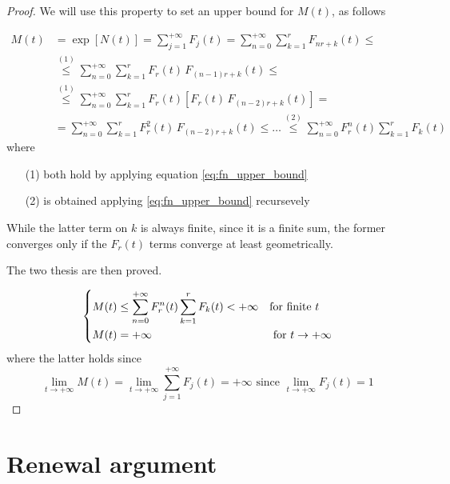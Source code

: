 \begin{proof}
	We will use this property to set an upper bound for $M(t)$, as follows

	\begin{equation} \label{eq:mt_convergence}
		\begin{split}
			M(t) &= \exp[N(t)] = \sum\limits_{j=1}^{+\infty} F_j(t) = \sum\limits_{n=0}^{+\infty} \sum\limits_{k=1}^{r} F_{n r + k}(t) \le \\
			& \stackrel{(1)}{\le} \sum\limits_{n=0}^{+\infty} \sum\limits_{k=1}^{r} F_r(t) \, F_{(n-1) r + k}(t) \le \\
			& \stackrel{(1)}{\le} \sum\limits_{n=0}^{+\infty} \sum\limits_{k=1}^{r} F_r(t) \left[ F_r(t) \, F_{(n-2) r + k}(t) \right] = \\
			& = \sum\limits_{n=0}^{+\infty} \sum\limits_{k=1}^{r} F^2_r(t) \, F_{(n-2) r + k}(t) \le \ldots \stackrel{(2)}{\le} \sum\limits_{n=0}^{+\infty} F^n_r(t) \sum\limits_{k=1}^{r} F_k(t)
		\end{split}
	\end{equation}
	where
	\begin{itemize}
		\item[(1)] both hold by applying equation \ref{eq:fn_upper_bound}
		\item[(2)] is obtained applying \ref{eq:fn_upper_bound} recursevely
	\end{itemize}

	While the latter term on $k$ is always finite, since it is a finite sum, the former converges only if the $F_r(t)$ terms converge at least geometrically.

	The two thesis are then proved.

	\begin{equation}
		\begin{dcases}
			M(t) \le \sum\limits_{n=0}^{+\infty} F^n_r(t) \sum\limits_{k=1}^{r} F_k(t) < + \infty & \text{for finite } t \\
			M(t) = +\infty & \text{ for } t \to +\infty
		\end{dcases}
	\end{equation}
	where the latter holds since
	$$ \lim_{t \to +\infty}M(t) = \lim_{t \to +\infty} \sum\limits_{j=1}^{+\infty} F_j(t) = +\infty \text{ since } \lim_{t \to +\infty} F_j(t) = 1 $$
\end{proof}

\section{Renewal argument}

